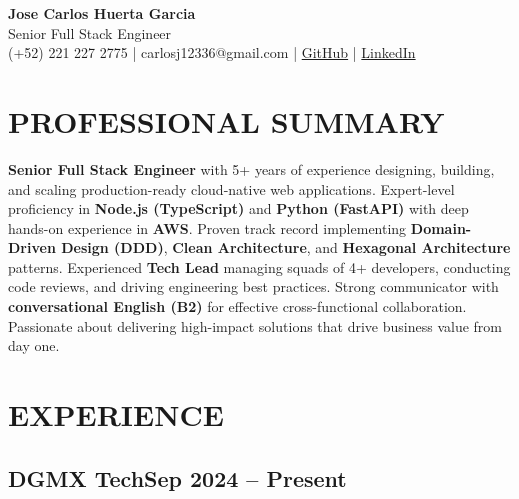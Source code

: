 \documentclass[a4paper,10pt]{article}
\newcommand{\kw}[1]{\textbf{\textcolor{keyword}{#1}}}
\newcommand{\tech}[1]{\textbf{\textcolor{tech}{#1}}}
\begin{document}
\begin{center}
{\bfseries\LARGE Jose Carlos Huerta Garcia} \\
Senior Full Stack Engineer \\
(+52) 221 227 2775 | carlosj12336@gmail.com | \href{https://github.com/jcarloshg}{GitHub} | \href{https://www.linkedin.com/in/jose-carlos-huerta-garcia-773952212}{LinkedIn}
\end{center}

\section*{PROFESSIONAL SUMMARY}
\tech{Senior Full Stack Engineer} with 5+ years of experience designing, building, and scaling production-ready cloud-native web applications. Expert-level proficiency in \kw{Node.js (TypeScript)} and \kw{Python (FastAPI)} with deep hands-on experience in \kw{AWS}. Proven track record implementing \kw{Domain-Driven Design (DDD)}, \kw{Clean Architecture}, and \kw{Hexagonal Architecture} patterns. Experienced \kw{Tech Lead} managing squads of 4+ developers, conducting code reviews, and driving engineering best practices. Strong communicator with \kw{conversational English (B2)} for effective cross-functional collaboration. Passionate about delivering high-impact solutions that drive business value from day one.

\section*{EXPERIENCE}

\subsection*{DGMX Tech\hfill\textbf{Sep 2024 -- Present}}
\end{document}
